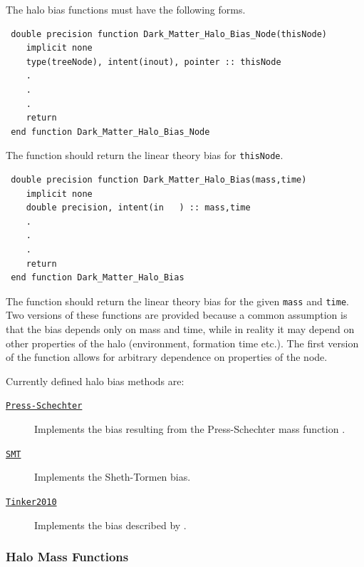 The halo bias functions must have the following forms.
\begin{verbatim}
 double precision function Dark_Matter_Halo_Bias_Node(thisNode)
    implicit none
    type(treeNode), intent(inout), pointer :: thisNode
    .
    .
    .
    return
 end function Dark_Matter_Halo_Bias_Node
\end{verbatim}
The function should return the linear theory bias for {\tt thisNode}.
\begin{verbatim}
 double precision function Dark_Matter_Halo_Bias(mass,time)
    implicit none
    double precision, intent(in   ) :: mass,time
    .
    .
    .
    return
 end function Dark_Matter_Halo_Bias
\end{verbatim}
The function should return the linear theory bias for the given {\tt mass} and {\tt time}. Two versions of these functions are provided because a common assumption is that the bias depends only on mass and time, while in reality it may depend on other properties of the halo (environment, formation time etc.). The first version of the function allows for arbitrary dependence on properties of the node.

Currently defined halo bias methods are:
\begin{description}
 \item [\hyperlink{structure_formation.halo_bias.Press-Schechter.F90:dark_matter_halo_biases_press_schechter:dark_matter_halo_bias_press_schechter}{{\tt Press-Schechter}}] Implements the bias resulting from the Press-Schechter \citep{press_formation_1974} mass function \citep{mo_analytic_1996}.
 \item [\hyperlink{structure_formation.halo_bias.SMT.F90:dark_matter_halo_biases_smt:dark_matter_halo_bias_smt}{{\tt SMT}}] Implements the Sheth-Tormen \citep{sheth_ellipsoidal_2001} bias.
 \item [\hyperlink{structure_formation.halo_bias.Tinker2010.F90:dark_matter_halo_biases_tinker2010:dark_matter_halo_bias_tinker2010}{{\tt Tinker2010}}] Implements the bias described by \cite{tinker_large_2010}.
\end{description}

\subsubsection{Halo Mass Functions}

